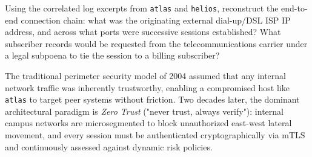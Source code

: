 \begin{retoforense}
Using the correlated log excerpts from \texttt{atlas} and \texttt{helios}, reconstruct the end-to-end connection chain: what was the originating external dial-up/DSL ISP IP address, and across what ports were successive sessions established? What subscriber records would be requested from the telecommunications carrier under a legal subpoena to tie the session to a billing subscriber?
\end{retoforense}

\begin{perspectiva20}
The traditional perimeter security model of 2004 assumed that any internal network traffic was inherently trustworthy, enabling a compromised host like \texttt{atlas} to target peer systems without friction. Two decades later, the dominant architectural paradigm is \textit{Zero Trust} ("never trust, always verify"): internal campus networks are microsegmented to block unauthorized east-west lateral movement, and every session must be authenticated cryptographically via mTLS and continuously assessed against dynamic risk policies.
\end{perspectiva20}
